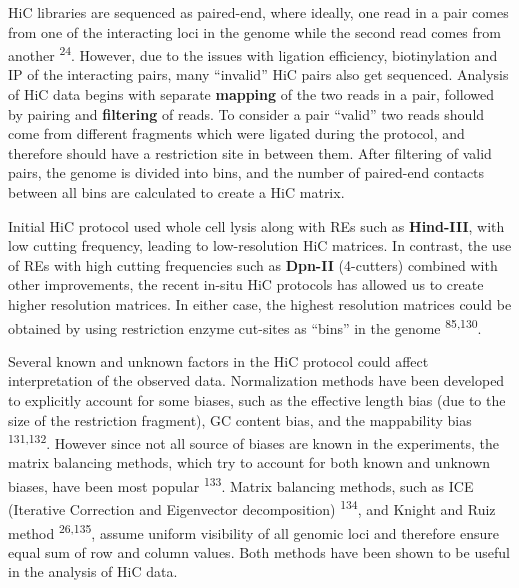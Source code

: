 \documentclass[11pt,twoside]{MPIthesis}
\theoremstyle{definition}
\theoremstyle{definition}
\theoremstyle{definition}
\theoremstyle{remark}
\begin{document}
HiC libraries are sequenced as paired-end, where ideally, one read in a
pair comes from one of the interacting loci in the genome while the
second read comes from another \textsuperscript{24}. However, due to the
issues with ligation efficiency, biotinylation and IP of the interacting
pairs, many ``invalid'' HiC pairs also get sequenced. Analysis of HiC
data begins with separate \textbf{mapping} of the two reads in a pair,
followed by pairing and \textbf{filtering} of reads. To consider a pair
``valid'' two reads should come from different fragments which were
ligated during the protocol, and therefore should have a restriction
site in between them. After filtering of valid pairs, the genome is
divided into bins, and the number of paired-end contacts between all
bins are calculated to create a HiC matrix.

Initial HiC protocol used whole cell lysis along with REs such as
\textbf{Hind-III}, with low cutting frequency, leading to low-resolution
HiC matrices. In contrast, the use of REs with high cutting frequencies
such as \textbf{Dpn-II} (4-cutters) combined with other improvements,
the recent in-situ HiC protocols has allowed us to create higher
resolution matrices. In either case, the highest resolution matrices
could be obtained by using restriction enzyme cut-sites as ``bins'' in
the genome \textsuperscript{85,130}.

Several known and unknown factors in the HiC protocol could affect
interpretation of the observed data. Normalization methods have been
developed to explicitly account for some biases, such as the effective
length bias (due to the size of the restriction fragment), GC content
bias, and the mappability bias \textsuperscript{131,132}. However since
not all source of biases are known in the experiments, the matrix
balancing methods, which try to account for both known and unknown
biases, have been most popular \textsuperscript{133}. Matrix balancing
methods, such as ICE (Iterative Correction and Eigenvector
decomposition) \textsuperscript{134}, and Knight and Ruiz method
\textsuperscript{26,135}, assume uniform visibility of all genomic loci
and therefore ensure equal sum of row and column values. Both methods
have been shown to be useful in the analysis of HiC data.
\end{document}
